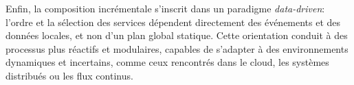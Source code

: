 Enfin, la composition incrémentale s’inscrit dans un paradigme \textit{data-driven}: l’ordre et la sélection des services dépendent directement des événements et des données locales, et non d’un plan global statique. Cette orientation conduit à des processus plus réactifs et modulaires, capables de s’adapter à des environnements dynamiques et incertains, comme ceux rencontrés dans le cloud, les systèmes distribués ou les flux continus.




